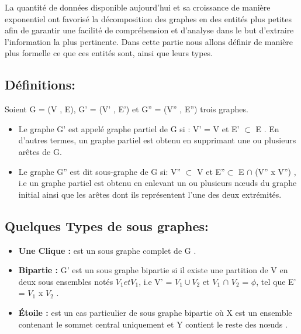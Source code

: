 
	La quantité de données disponible aujourd'hui et sa croissance de manière exponentiel ont favorisé la décomposition des graphes en des entités plus petites afin de garantir une facilité de compréhension et d'analyse dans le but d'extraire l'information la plus pertinente. Dans cette partie nous allons définir de manière plus formelle ce que ces entités sont, ainsi que leurs types.
	
		
		
		
		\subsection{Définitions:}
		Soient G = (V , E), G' = (V' , E') et G'' = (V'' , E'') trois graphes.
		\begin{itemize}[label=$\circ$]
		
			\item Le graphe G' est appelé graphe partiel de G si : V' = V et E' $\subset$ E \citep{DUT}. En d'autres termes, un graphe partiel est obtenu en supprimant une ou plusieurs arêtes de G.
				

			\item Le graphe G'' est dit sous-graphe de G si: V'' $\subset$ V et 
			 E''$\subset$ E $\cap$ (V'' x V'') \citep{bac}, i.e un graphe partiel est obtenu en enlevant un ou plusieurs nœuds du graphe initial ainsi que les arêtes dont ils représentent l'une des deux extrémités.
			 
		\end{itemize}
		
		\subsection{Quelques Types de sous graphes:}
		
		\begin{itemize} [label = $\bullet$]
		
		
			\item \textbf{Une Clique :} est un sous graphe complet de G \citep{bac}.
			
			\item \textbf{Bipartie :} G' est un sous graphe bipartie si il existe une partition de V en deux sous ensembles notés $V_{1} et V_{1}$, i.e V' = $V_{1} \cup V_{2}$ et $V_{1}$ $\cap$ $V_{2}$ = $\phi$, tel que E' = $V_{1}$ x $V_{2}$ \citep{bac}.
			
			\item \textbf{Étoile :}
			 est un cas particulier de sous graphe bipartie où X est un ensemble contenant le sommet central uniquement et Y contient le reste des nœuds \citep{koutra2015summarizing} .
			 
		
			 
		\end{itemize}